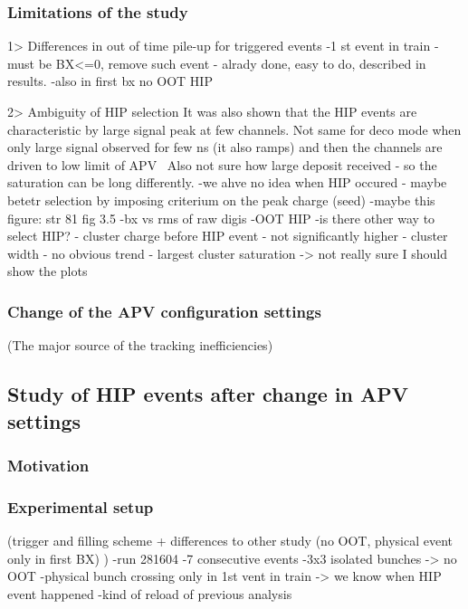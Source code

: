 \subsubsection{Limitations of the study}

         1> Differences in out of time pile-up for triggered events
-1 st event in train - must be BX<=0, remove such event - alrady done, easy to do, described in results.
-also in first bx no OOT HIP

         2> Ambiguity of HIP selection
It was also shown that the HIP events are characteristic by large signal peak at few channels. Not same for deco mode when only large signal observed for few ns (it also ramps) and then the channels are driven to low limit of APV~\cite{Bainbridge:2002bda} Also not sure how large deposit received - so the saturation can be long differently.
-we ahve no idea when HIP occured - maybe betetr selection by imposing criterium on the peak charge (seed)
-maybe this figure: str 81 fig 3.5
-bx vs rms of raw digis
-OOT HIP
-is there other way to select HIP?
	- cluster charge before HIP event - not significantly higher
	- cluster width - no obvious trend
	- largest cluster saturation
        -> not really sure I should show the plots

\subsubsection{Change of the APV configuration settings}
          (The major source of the tracking inefficiencies)
\subsection{Study of HIP events after change in APV settings}

\subsubsection{Motivation}

\subsubsection{Experimental setup}
        (trigger and filling scheme + differences to other study (no OOT, physical event only in first BX) )
-run 281604
-7 consecutive events
-3x3 isolated bunches -> no OOT
-physical bunch crossing only in 1st vent in train
-> we know when HIP event happened
-kind of reload of previous analysis
